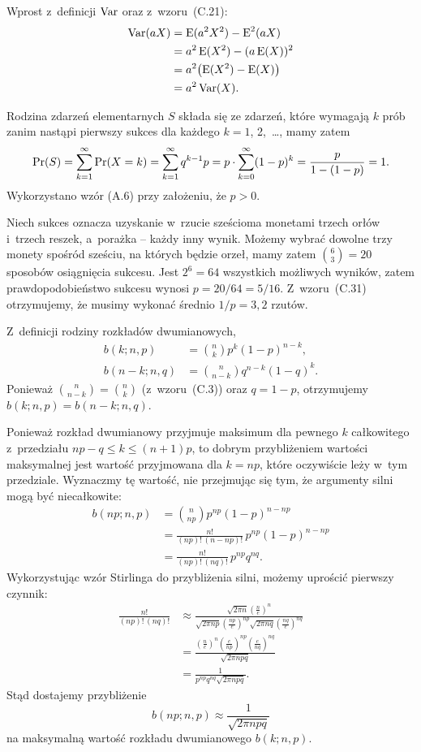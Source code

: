 \exercise{} %
Wprost z~definicji $\operatorname{Var}$ oraz z~wzoru~(C.21):
\begin{align*}
	\operatorname{Var}(aX) &= \operatorname{E}(a^2X^2)-\operatorname{E}^2(aX) \\
	&= a^2\operatorname{E}(X^2)-(a\operatorname{E}(X))^2 \\
	&= a^2\bigl(\operatorname{E}(X^2)-\operatorname{E}(X)\bigr) \\
	&= a^2\operatorname{Var}(X).
\end{align*}

\exercise{} %
Rodzina zdarzeń elementarnych $S$ składa się ze zdarzeń, które wymagają $k$ prób zanim nastąpi pierwszy sukces dla każdego $k=1$, 2,~\dots, mamy zatem
\[
	\Pr(S) = \sum_{k=1}^\infty\Pr(X=k) = \sum_{k=1}^\infty q^{k-1}p = p\cdot\sum_{k=0}^\infty (1-p)^k = \frac{p}{1-(1-p)} \\[1mm] = 1.
\]
Wykorzystano wzór (A.6) przy założeniu, że $p>0$.

\exercise{} %
Niech sukces oznacza uzyskanie w~rzucie sześcioma monetami trzech orłów i~trzech reszek, a~porażka -- każdy inny wynik. Możemy wybrać dowolne trzy monety spośród sześciu, na których będzie orzeł, mamy zatem $\binom{6}{3}=20$ sposobów osiągnięcia sukcesu. Jest $2^6=64$ wszystkich możliwych wyników, zatem prawdopodobieństwo sukcesu wynosi $p=20/64=5/16$. Z~wzoru~(C.31) otrzymujemy, że musimy wykonać średnio $1/p=3{,}2$ rzutów.

\exercise{} %
Z~definicji rodziny rozkładów dwumianowych,
\begin{align*}
	b(k;n,p) &= \binom{n}{k}p^k(1-p)^{n-k}, \\
	b(n-k;n,q) &= \binom{n}{n-k}q^{n-k}(1-q)^k.
\end{align*}
Ponieważ $\binom{n}{n-k}=\binom{n}{k}$ (z~wzoru~(C.3)) oraz $q=1-p$, otrzymujemy $b(k;n,p)=b(n-k;n,q)$.

\exercise{} %
Ponieważ rozkład dwumianowy przyjmuje maksimum dla pewnego $k$ całkowitego z~przedziału $np-q\le k\le(n+1)p$, to dobrym przybliżeniem wartości maksymalnej jest wartość przyjmowana dla $k=np$, które oczywiście leży w~tym przedziale. Wyznaczmy tę wartość, nie przejmując się tym, że argumenty silni mogą być niecałkowite:
\begin{align*}
	b(np;n,p) &= \binom{n}{np}p^{np}(1-p)^{n-np} \\
	&= \frac{n!}{(np)!\,(n-np)!}\,p^{np}(1-p)^{n-np} \\
	&= \frac{n!}{(np)!\,(nq)!}\,p^{np}q^{nq}.
\end{align*}
Wykorzystując wzór Stirlinga do przybliżenia silni, możemy uprościć pierwszy czynnik:
\begin{align*}
	\frac{n!}{(np)!\,(nq)!} &\approx \frac{\sqrt{2\pi n}\left(\frac{n}{e}\right)^n}{\sqrt{2\pi np}\left(\frac{np}{e}\right)^{np}\sqrt{2\pi nq}\left(\frac{nq}{e}\right)^{nq}} \\[1mm]
	&= \frac{\left(\frac{n}{e}\right)^n\left(\frac{e}{np}\right)^{np}\left(\frac{e}{nq}\right)^{nq}}{\sqrt{2\pi npq}} \\[1mm]
	&= \frac{1}{p^{np}q^{nq}\sqrt{2\pi npq}}.
\end{align*}
Stąd dostajemy przybliżenie
\[
	b(np;n,p) \approx \frac{1}{\sqrt{2\pi npq}}
\]
na maksymalną wartość rozkładu dwumianowego $b(k;n,p)$.

